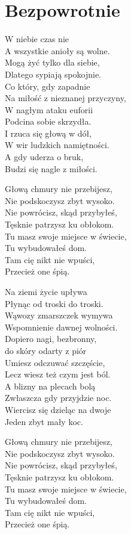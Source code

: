\section{Bezpowrotnie}
\begin{text}
W niebie czas nie \\
A wszystkie anioły są wolne.\\
Mogą żyć tylko dla siebie,\\
Dlatego sypiają spokojnie.\\
Co który, gdy zapadnie\\
Na miłość z nieznanej przyczyny,\\
W nagłym ataku euforii\\
Podcina sobie skrzydła.\\
I rzuca się głową w dół,\\
W wir ludzkich namiętności.\\
A gdy uderza o bruk,\\
Budzi się nagle z miłości.

Głową chmury nie przebijesz,\\
Nie podskoczysz zbyt wysoko.\\
Nie powrócisz, skąd przybyłeś,\\
Tęsknie patrzysz ku obłokom.\\
Tu masz swoje miejsce w świecie,\\
Tu wybudowałeś dom.\\
Tam cię nikt nie wpuści,\\
Przecież one śpią.

Na ziemi życie upływa\\
Płynąc od troski do troski.\\
Wąwozy zmarszczek wymywa\\
Wspomnienie dawnej wolności.\\
Dopiero nagi, bezbronny,\\
do skóry odarty z piór\\
Umiesz odczuwać szczęście,\\
Lecz wiesz też czym jest ból.\\
A blizny na plecach bolą\\
Zwłaszcza gdy przyjdzie noc.\\
Wiercisz się dzieląc na dwoje\\
Jeden zbyt mały koc.

Głową chmury nie przebijesz,\\
Nie podskoczysz zbyt wysoko.\\
Nie powrócisz, skąd przybyłeś,\\
Tęsknie patrzysz ku obłokom.\\
Tu masz swoje miejsce w świecie,\\
Tu wybudowałeś dom.\\
Tam cię nikt nie wpuści,\\
Przecież one śpią.


\end{text}
